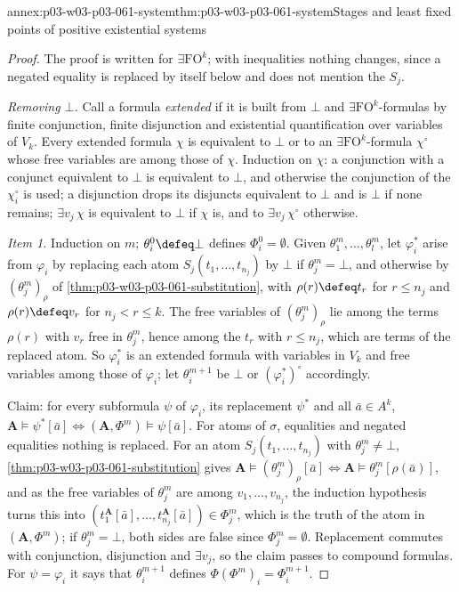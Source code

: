 \begin{annexitem}{annex:p03-w03-p03-061-system}{thm:p03-w03-p03-061-system}{Stages and least fixed points of positive existential systems}
\begin{proof}
The proof is written for \(\exists\mathrm{FO}^k\); with inequalities nothing
changes, since a negated equality is replaced by itself below and does not
mention the \(S_j\).

\emph{Removing \(\bot\).} Call a formula \emph{extended} if it is built from
\(\bot\) and \(\exists\mathrm{FO}^k\)-formulas by finite conjunction, finite
disjunction and existential quantification over variables of \(V_k\).
Every extended formula \(\chi\) is equivalent to \(\bot\) or to an
\(\exists\mathrm{FO}^k\)-formula \(\chi^\circ\) whose free variables are among
those of \(\chi\). Induction on \(\chi\): a conjunction with a conjunct
equivalent to \(\bot\) is equivalent to \(\bot\), and otherwise the
conjunction of the \(\chi_i^\circ\) is used; a disjunction drops its
disjuncts equivalent to \(\bot\) and is \(\bot\) if none remains;
\(\exists v_j\,\chi\) is equivalent to \(\bot\) if \(\chi\) is, and to
\(\exists v_j\,\chi^\circ\) otherwise.

\emph{Item 1.} Induction on \(m\); \(\theta^0_i\defeq\bot\) defines
\(\Phi^0_i=\emptyset\). Given \(\theta^m_1,\ldots,\theta^m_l\), let
\(\varphi_i^*\) arise from \(\varphi_i\) by replacing each atom
\(S_j(t_1,\ldots,t_{n_j})\) by \(\bot\) if \(\theta^m_j=\bot\), and otherwise
by \((\theta^m_j)_\rho\) of \cref{thm:p03-w03-p03-061-substitution}, with
\(\rho(r)\defeq t_r\) for \(r\le n_j\) and \(\rho(r)\defeq v_r\) for
\(n_j<r\le k\). The free variables of \((\theta^m_j)_\rho\) lie among the
terms \(\rho(r)\) with \(v_r\) free in \(\theta^m_j\), hence among the
\(t_r\) with \(r\le n_j\), which are terms of the replaced atom. So
\(\varphi_i^*\) is an extended formula with variables in \(V_k\) and free
variables among those of \(\varphi_i\); let \(\theta^{m+1}_i\) be \(\bot\) or
\((\varphi_i^*)^\circ\) accordingly.

Claim: for every subformula \(\psi\) of \(\varphi_i\), its replacement
\(\psi^*\) and all \(\bar a\in A^k\),
\(\mathbf A\models\psi^*[\bar a]\iff(\mathbf A,\Phi^m)\models\psi[\bar a]\).
For atoms of \(\sigma\), equalities and negated equalities nothing is
replaced. For an atom \(S_j(t_1,\ldots,t_{n_j})\) with \(\theta^m_j\neq\bot\),
\cref{thm:p03-w03-p03-061-substitution} gives
\(\mathbf A\models(\theta^m_j)_\rho[\bar a]\iff\mathbf
A\models\theta^m_j[\rho(\bar a)]\), and as the free variables of
\(\theta^m_j\) are among \(v_1,\ldots,v_{n_j}\), the induction hypothesis
turns this into \((t_1^{\mathbf A}[\bar a],\ldots,t_{n_j}^{\mathbf A}[\bar
a])\in\Phi^m_j\), which is the truth of the atom in \((\mathbf A,\Phi^m)\);
if \(\theta^m_j=\bot\), both sides are false since \(\Phi^m_j=\emptyset\).
Replacement commutes with conjunction, disjunction and \(\exists v_j\), so
the claim passes to compound formulas. For \(\psi=\varphi_i\) it says that
\(\theta^{m+1}_i\) defines \(\Phi(\Phi^m)_i=\Phi^{m+1}_i\).


\end{proof}
\end{annexitem}
